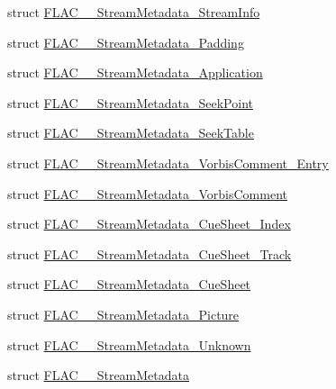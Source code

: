\begin{DoxyCompactItemize}
\item 
struct \hyperlink{struct_f_l_a_c_____stream_metadata___stream_info}{F\+L\+A\+C\+\_\+\+\_\+\+Stream\+Metadata\+\_\+\+Stream\+Info}
\item 
struct \hyperlink{struct_f_l_a_c_____stream_metadata___padding}{F\+L\+A\+C\+\_\+\+\_\+\+Stream\+Metadata\+\_\+\+Padding}
\item 
struct \hyperlink{struct_f_l_a_c_____stream_metadata___application}{F\+L\+A\+C\+\_\+\+\_\+\+Stream\+Metadata\+\_\+\+Application}
\item 
struct \hyperlink{struct_f_l_a_c_____stream_metadata___seek_point}{F\+L\+A\+C\+\_\+\+\_\+\+Stream\+Metadata\+\_\+\+Seek\+Point}
\item 
struct \hyperlink{struct_f_l_a_c_____stream_metadata___seek_table}{F\+L\+A\+C\+\_\+\+\_\+\+Stream\+Metadata\+\_\+\+Seek\+Table}
\item 
struct \hyperlink{struct_f_l_a_c_____stream_metadata___vorbis_comment___entry}{F\+L\+A\+C\+\_\+\+\_\+\+Stream\+Metadata\+\_\+\+Vorbis\+Comment\+\_\+\+Entry}
\item 
struct \hyperlink{struct_f_l_a_c_____stream_metadata___vorbis_comment}{F\+L\+A\+C\+\_\+\+\_\+\+Stream\+Metadata\+\_\+\+Vorbis\+Comment}
\item 
struct \hyperlink{struct_f_l_a_c_____stream_metadata___cue_sheet___index}{F\+L\+A\+C\+\_\+\+\_\+\+Stream\+Metadata\+\_\+\+Cue\+Sheet\+\_\+\+Index}
\item 
struct \hyperlink{struct_f_l_a_c_____stream_metadata___cue_sheet___track}{F\+L\+A\+C\+\_\+\+\_\+\+Stream\+Metadata\+\_\+\+Cue\+Sheet\+\_\+\+Track}
\item 
struct \hyperlink{struct_f_l_a_c_____stream_metadata___cue_sheet}{F\+L\+A\+C\+\_\+\+\_\+\+Stream\+Metadata\+\_\+\+Cue\+Sheet}
\item 
struct \hyperlink{struct_f_l_a_c_____stream_metadata___picture}{F\+L\+A\+C\+\_\+\+\_\+\+Stream\+Metadata\+\_\+\+Picture}
\item 
struct \hyperlink{struct_f_l_a_c_____stream_metadata___unknown}{F\+L\+A\+C\+\_\+\+\_\+\+Stream\+Metadata\+\_\+\+Unknown}
\item 
struct \hyperlink{struct_f_l_a_c_____stream_metadata}{F\+L\+A\+C\+\_\+\+\_\+\+Stream\+Metadata}
\end{DoxyCompactItemize}

